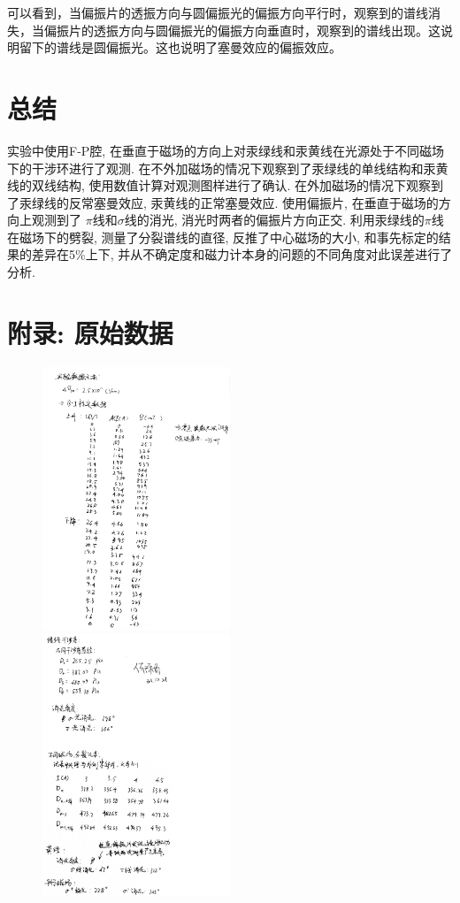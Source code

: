 \documentclass[12pt,a4paper]{article}
\begin{document}
  可以看到，当偏振片的透振方向与圆偏振光的偏振方向平行时，观察到的谱线消失，当偏振片的透振方向与圆偏振光的偏振方向垂直时，观察到的谱线出现。这说明留下的谱线是圆偏振光。这也说明了塞曼效应的偏振效应。
\section{总结}
实验中使用F-P腔, 在垂直于磁场的方向上对汞绿线和汞黄线在光源处于不同磁场下的干涉环进行了观测. 在不外加磁场的情况下观察到了汞绿线的单线结构和汞黄线的双线结构, 使用数值计算对观测图样进行了确认. 在外加磁场的情况下观察到了汞绿线的反常塞曼效应, 汞黄线的正常塞曼效应. 使用偏振片, 在垂直于磁场的方向上观测到了
$\pi$线和$\sigma$线的消光, 消光时两者的偏振片方向正交. 利用汞绿线的$\pi$线在磁场下的劈裂, 测量了分裂谱线的直径, 反推了中心磁场的大小, 和事先标定的结果的差异在5\%上下, 并从不确定度和磁力计本身的问题的不同角度对此误差进行了分析. 
\printbibliography
\section{附录: 原始数据}
\begin{figure}[H]
    \centering
    \includegraphics[width=0.5\textwidth]{Ata1.jpg}
    \includegraphics[width=0.5\textwidth]{Ata2.jpg}
\end{figure}
\end{document}
